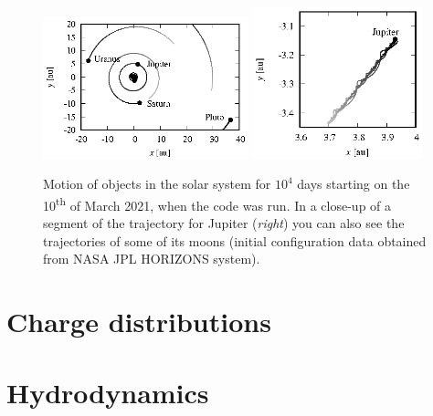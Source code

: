 \begin{figure}
  \begin{center}
  \includegraphics[width = 0.53\textwidth]{figures/gravity.eps}
  \includegraphics[width = 0.44\textwidth]{figures/Jupiter.eps}
  \end{center}
  \caption{\label{gravity}Motion of objects in the solar system for $10^4$ days 
           starting on the 10\textsuperscript{th} of March 2021, when the code 
           was run. In a close-up of a segment of the trajectory for Jupiter 
           (\textit{right}) you can also see the trajectories of some of its 
           moons (initial configuration data obtained from NASA JPL HORIZONS 
           system).}
\end{figure}

\section{Charge distributions}

\section{Hydrodynamics}
